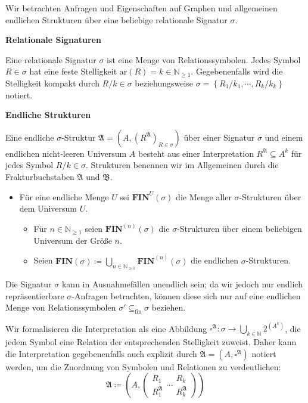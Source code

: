 Wir betrachten Anfragen und Eigenschaften auf Graphen und allgemeinen
endlichen Strukturen über eine beliebige relationale Signatur $\sigma$.
\begin{defn}
\textbf{Relationale Signaturen}

Eine relationale Signatur $\sigma$ ist eine Menge von Relationssymbolen.
Jedes Symbol $R\in\sigma$ hat eine feste Stelligkeit $\mathrm{ar}\left(R\right)=k\in\mathbb{N}_{\geqslant1}$.
Gegebenenfalls wird die Stelligkeit kompakt durch $R/k\in\sigma$
beziehungsweise $\sigma=\left\{ R_{1}/k_{1},\cdots,R_{k}/k_{k}\right\} $
notiert.
\end{defn}
%
\begin{defn}
\textbf{Endliche Strukturen}

Eine endliche $\sigma$-Struktur $\mathfrak{A}=\left(A,\left(R^{\mathfrak{A}}\right)_{R\in\sigma}\right)$
über einer Signatur $\sigma$ und einem endlichen nicht-leeren Universum
$A$ besteht aus einer Interpretation $R^{\mathfrak{A}}\subseteq A^{k}$
für jedes Symbol $R/k\in\sigma$. Strukturen benennen wir im Allgemeinen
durch die Frakturbuchstaben $\mathfrak{A}$ und $\mathfrak{B}$.

\end{defn}
\begin{itemize}
\item Für eine endliche Menge $U$ sei $\mathbf{FIN}^{U}\left(\sigma\right)$
die Menge aller $\sigma$-Strukturen über dem Universum $U$.
\begin{itemize}
\item Für $n\in\mathbb{N}_{\geqslant1}$ seien $\mathbf{FIN}^{\left(n\right)}\left(\sigma\right)$
die $\sigma$-Strukturen über einem beliebigen Universum der Größe
$n$.
\item Seien $\mathbf{FIN}\left(\sigma\right)\coloneqq\bigcup_{n\in\mathbb{N}_{\geqslant1}}\mathbf{FIN}^{\left(n\right)}\left(\sigma\right)$
die endlichen $\sigma$-Strukturen.
\end{itemize}
\end{itemize}
Die Signatur $\sigma$ kann in Ausnahmefällen unendlich sein; da wir
jedoch nur endlich repräsentierbare $\sigma$-Anfragen betrachten,
können diese sich nur auf eine endlichen Menge von Relationssymbolen
$\sigma'\subseteq_{\mathrm{fin}}\sigma$ beziehen.

Wir formalisieren die Interpretation als eine Abbildung $\square^{\mathfrak{A}}:\sigma\rightarrow\bigcup_{k\in\mathbb{N}}2^{\left(A^{k}\right)}$,
die jedem Symbol eine Relation der entsprechenden Stelligkeit zuweist.
Daher kann die Interpretation gegebenenfalls auch explizit durch $\mathfrak{A}=\left(A,\square^{\mathfrak{A}}\right)$
notiert werden, um die Zuordnung von Symbolen und Relationen zu verdeutlichen:
\[
\mathfrak{A}\coloneqq\left(A,\left(\begin{array}{c}
R_{1}\\
R_{1}^{\mathfrak{A}}
\end{array}\cdots\begin{array}{c}
R_{k}\\
R_{k}^{\mathfrak{A}}
\end{array}\right)\right)
\]

